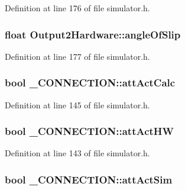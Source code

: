 \-Definition at line 176 of file simulator.\-h.

\hypertarget{group___h_i_t_l_plugin_ga03a3c3371749ca83551e6f29e804a205}{
\subsubsection[{angle\-Of\-Slip}]{\setlength{\rightskip}{0pt plus 5cm}float {\bf \-Output2\-Hardware\-::angle\-Of\-Slip}}}\label{group___h_i_t_l_plugin_ga03a3c3371749ca83551e6f29e804a205}


\-Definition at line 177 of file simulator.\-h.

\hypertarget{group___h_i_t_l_plugin_gab40adc150ae79f115f2680cdf131b41d}{
\subsubsection[{att\-Act\-Calc}]{\setlength{\rightskip}{0pt plus 5cm}bool {\bf \-\_\-\-C\-O\-N\-N\-E\-C\-T\-I\-O\-N\-::att\-Act\-Calc}}}\label{group___h_i_t_l_plugin_gab40adc150ae79f115f2680cdf131b41d}


\-Definition at line 145 of file simulator.\-h.

\hypertarget{group___h_i_t_l_plugin_ga4e0f8f54388f25df1142b8f895a4b445}{
\subsubsection[{att\-Act\-H\-W}]{\setlength{\rightskip}{0pt plus 5cm}bool {\bf \-\_\-\-C\-O\-N\-N\-E\-C\-T\-I\-O\-N\-::att\-Act\-H\-W}}}\label{group___h_i_t_l_plugin_ga4e0f8f54388f25df1142b8f895a4b445}


\-Definition at line 143 of file simulator.\-h.

\hypertarget{group___h_i_t_l_plugin_ga8620f5c9256ac5988861939a70fde264}{
\subsubsection[{att\-Act\-Sim}]{\setlength{\rightskip}{0pt plus 5cm}bool {\bf \-\_\-\-C\-O\-N\-N\-E\-C\-T\-I\-O\-N\-::att\-Act\-Sim}}}\label{group___h_i_t_l_plugin_ga8620f5c9256ac5988861939a70fde264}


